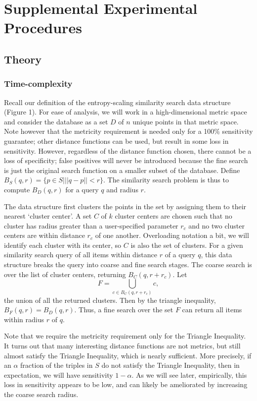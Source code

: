 \documentclass[review,preprint,12pt]{elsarticle}
\theoremstyle{definition}
\theoremstyle{remark}
\begin{document}
\section{Supplemental Experimental Procedures}

\subsection{Theory}
\subsubsection{Time-complexity}
Recall our definition of the entropy-scaling similarity search data structure (Figure 1).
For ease of analysis, we will work in a high-dimensional metric space and consider the database as a set $D$ of $n$ unique points in that metric space.
Note however that the metricity requirement is needed only for a 100\% sensitivity guarantee; other distance functions can be used, but result in some loss in sensitivity.
However, regardless of the distance function chosen, there cannot be a loss of
specificity; false positives will never be introduced because the fine search is just the original search function on a smaller subset of the database.
Define $B_S(q,r) = \{ p \in S | ||q-p||<r \}$. The similarity search problem is thus to compute $B_D(q,r)$ for a query $q$ and radius $r$.

The data structure first clusters the points in the set by assigning them to their nearest `cluster center'.
A set $C$ of $k$ cluster centers are chosen such that no cluster has radius greater than a user-specified parameter $r_c$ and no two cluster centers are within distance $r_c$ of one another.
Overloading notation a bit, we will identify each cluster with its center, so $C$ is also the set of clusters.
For a given similarity search query of all items within distance $r$ of a query $q$, this data structure breaks the query into coarse and fine search stages.
The coarse search is over the list of cluster centers, returning $B_C(q,r + r_c)$.
Let \[\displaystyle F = \bigcup_{c \in B_C(q,r+r_c)} c , \] the union of all the returned clusters.
Then by the triangle inequality, $B_F(q,r) = B_D(q,r)$.
Thus, a fine search over the set $F$ can return all items within radius $r$ of $q$.

Note that we require the metricity requirement only for the Triangle Inequality.
It turns out that many interesting distance functions are not metrics, but still almost satisfy the Triangle Inequality, which is nearly sufficient.
More precisely, if an $\alpha$ fraction of the triples in $S$ do not satisfy the Triangle Inequality, then in expectation, we will have sensitivity $1 - \alpha$.
As we will see later, empirically, this loss in sensitivity appears to be low, and can likely be ameliorated by increasing the coarse search radius.
\end{document}
